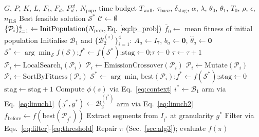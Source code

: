 \documentclass[a4paper,fleqn]{cas-dc}
\begin{document}
\begin{algorithm}[t]
\caption{LCB-IMMA (Linear Contextual Bandit Island-Model Memetic Algorithm)}
\label{alg:lcbimma}
\begin{algorithmic}[1]
\Require $G$, $P$, $K$, $L$, $F_t$, $F_d$, $F_d^{vt}$, $N_{\mathrm{pop}}$, time budget $T_{\mathrm{wall}}$,
  $\tau_{\mathrm{base}}$, $\delta_{\mathrm{stag}}$, $\alpha$, $\lambda$,
  $\theta_0$, $\theta_1$, $T_0$, $\rho$, $\epsilon$, $n_{\mathrm{ILS}}$
\Ensure Best feasible solution $\mathcal{S}^*$
\State $\mathcal{C} \gets \emptyset$ 
\State $\{\mathcal{P}_i\}_{i=1}^{4} \gets \mathrm{InitPopulation}(N_{\mathrm{pop}}, \text{Eq.~\eqref{eq:lp_prob}})$ 
\State $\bar{f}_0 \gets $ mean fitness of initial population 
\State Initialise $\mathcal{B}_1$ and $\{\mathcal{B}_2^{(i)}\}_{i=1}^4$: $A_a \gets I_7$, $b_a \gets \mathbf{0}$, $\hat\theta_a \gets \mathbf{0}$
\State $\mathcal{S}^* \gets \arg\min_{\mathcal{S}} f(\mathcal{S})$;\quad $f^* \gets f(\mathcal{S}^*)$;\quad $\mathrm{stag} \gets 0$;\quad $\tau \gets 0$
 
 \State $\tau \gets \tau + 1$
 \State $\mathcal{P}_i \gets \mathrm{LocalSearch}_i(\mathcal{P}_i)$
 \State $\mathcal{P}_i \gets \mathrm{EmissionCrossover}(\mathcal{P}_i)$
 \State $\mathcal{P}_i \gets \mathrm{Mutate}(\mathcal{P}_i)$
 \State $\mathcal{P}_i \gets \mathrm{SortByFitness}(\mathcal{P}_i)$
 \EndFor
 \State $\mathcal{S}^* \gets \arg\min_i \mathrm{best}(\mathcal{P}_i)$;\quad $f^* \gets f(\mathcal{S}^*)$;\quad $\mathrm{stag} \gets 0$
 \Else
 \State $\mathrm{stag} \gets \mathrm{stag} + 1$
 \EndIf
 \State Compute $\phi(s)$ via Eq.~\eqref{eq:context}
 \State $i^* \gets \mathcal{B}_1$ arm via Eq.~\eqref{eq:linucb1}
 \State $(j^*, g^*) \gets \mathcal{B}_2^{(i^*)}$ arm via Eq.~\eqref{eq:linucb2}
 \State $f_{\mathrm{before}} \gets f(\mathrm{best}(\mathcal{P}_{j^*}))$
 \State Extract segments from $I_{i^*}$ at granularity $g^*$
 \State Filter via Eqs.~\eqref{eq:filter}-\eqref{eq:threshold}
  \State Repair $\pi$ (Sec.~\ref{sec:alg3}); evaluate $f(\pi)$

\end{algorithmic}
\end{algorithm}
\end{document}
